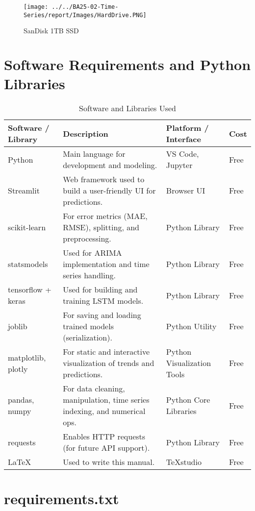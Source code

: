 \begin{figure}[H]
	\centering
	\texttt{[image: ../../BA25-02-Time-Series/report/Images/HardDrive.PNG]}
	\caption{SanDisk 1TB SSD}
\end{figure}

\newpage

\section{Software Requirements and Python Libraries}

\begin{table}[H]
	\centering
	\renewcommand{\arraystretch}{1.5}
	\begin{tabular}{|m{3.5cm}|m{5.5cm}|m{3.5cm}|m{1.8cm}|}
		\hline
		\textbf{Software / Library} & \textbf{Description} & \textbf{Platform / Interface} & \textbf{Cost} \\
		\hline
		Python & Main language for development and modeling. & VS Code, Jupyter & Free \\
		\hline
		Streamlit & Web framework used to build a user-friendly UI for predictions. & Browser UI & Free \\
		\hline
		scikit-learn & For error metrics (MAE, RMSE), splitting, and preprocessing. & Python Library & Free \\
		\hline
		statsmodels & Used for ARIMA implementation and time series handling. & Python Library & Free \\
		\hline
		tensorflow + keras & Used for building and training LSTM models. & Python Library & Free \\
		\hline
		joblib & For saving and loading trained models (serialization). & Python Utility & Free \\
		\hline
		matplotlib, plotly & For static and interactive visualization of trends and predictions. & Python Visualization Tools & Free \\
		\hline
		pandas, numpy & For data cleaning, manipulation, time series indexing, and numerical ops. & Python Core Libraries & Free \\
		\hline
		requests & Enables HTTP requests (for future API support). & Python Library & Free \\
		\hline
		LaTeX & Used to write this manual. & TeXstudio & Free \\
		\hline
	\end{tabular}
	\caption{Software and Libraries Used}
	\label{tab:software}
\end{table}
\newpage
\section{requirements.txt}

